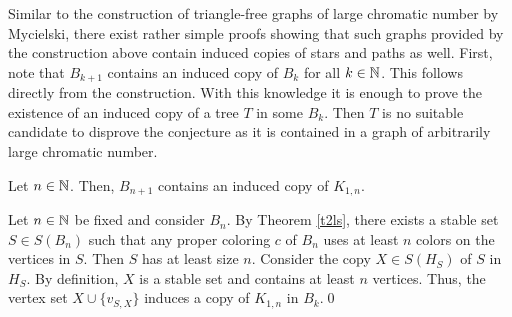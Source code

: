 \begin{comment}
Now we want to construct $\mathcal{P}_{k+1}$. For each $p\in\mathcal{P}_k$ and every $q\in\mathcal{P}_{p}$ let $\mathcal{L}(p)$ be the set of segments in $\mathcal{P}_k$ intersecting $p$ and $\mathcal{L}_p(q)$ the segments in $\mathcal{L}(p)$ intersecting $q$. We add two probes to $\mathcal{P}_{k+1}$. We place the first one, the upper probe $u_q$, close to the top of $q$, such that the diagonal $d_q$ but no other segment in $\mathcal{L}_p(q)$ intersects it and choose the second probe, the lower probe $l_q$, close to the bottom of $q$ such that it contains all segments in $\mathcal{L}_p(q)$ but not $d_q$. Then, both probes end at the right boundary of $R$. By the induction hypothesis and the way we placed $\mathcal{L}_p$, $\mathcal{L}(p)\cup \lbrace d_q\rbrace$ and $\mathcal{L}(p)\cup\mathcal{L}_p(q)$ are both independent sets, i.e. both $u_q$ and $l_q$ are proper probes. Finally, observe that $\vert \mathcal{P}_{k+1}\vert = 2p_k^2=p_{k+1}$.

Let $c$ be a coloring of $\mathcal{L}_{k+1}$. Consider the restriction of $c$ to the original copy of $\mathcal{L}_k$. By the induction hypothesis, there exists a probe $p\in\mathcal{P}_k$ for which $c$ needs $k$ colors to paint the line segments in $p$. Now, consider the copy $\mathcal{L}_p$ of $\mathcal{L}_k$ in the root of $p$. Again, by induction hypothesis, there is a probe $q\in\mathcal{P}_p$ that uses $k$ colors on the segments in $\mathcal{L}_p$ intersecting $q$. If the colors used by $c$ in $p$ and $q$ are different, at least $k+1$ colors are used on the segments pierced by the lower probe $l_q$. Otherwise, $d_q$ has a different color than the colors used in $p$ and $q$ and thus, $c$ uses $k+1$ colors on the segments pierced by the upper probe $u_q$.\qed
\end{prf}
\end{comment}
Similar to the construction of triangle-free graphs of large chromatic number by Mycielski, there exist rather simple proofs showing that such graphs provided by the construction above contain induced copies of stars and paths as well.
First, note that $B_{k+1}$ contains an induced copy of $B_k$ for all $k\in\mathbb{N}$. This follows directly from the construction. With this knowledge it is enough to prove the existence of an induced copy of a tree $T$ in some $B_k$. Then $T$ is no suitable candidate to disprove the conjecture as it is contained in a graph of arbitrarily large chromatic number.

\begin{thm}
Let $n\in\mathbb{N}$. Then, $B_{n+1}$ contains an induced copy of $K_{1,n}$.
\end{thm}
\begin{prf}
Let $n\in\mathbb{N}$ be fixed and consider $B_n$. By Theorem \ref{t2ls}, there exists a stable set $S\in S(B_n)$ such that any proper coloring $c$ of $B_n$ uses at least $n$ colors on the vertices in $S$. Then $S$ has at least size $n$. Consider the copy $X\in S(H_S)$ of $S$ in $H_S$. By definition, $X$ is a stable set and contains at least $n$ vertices. Thus, the vertex set $X\cup \lbrace v_{S,X}\rbrace$ induces a copy of $K_{1,n}$ in $B_k$.\qed   
\end{prf}

